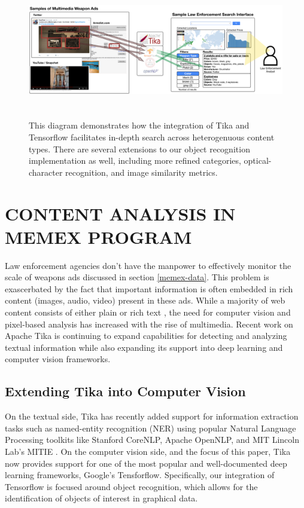 \begin{figure}
	\includegraphics[width=\textwidth,height=6cm]{interface-diagram}
	\caption{This diagram demonstrates how the integration of Tika and Tensorflow facilitates in-depth search across heterogenuous content types. There are several extensions to our object recognition implementation as well, including more refined categories, optical-character recognition, and image similarity metrics.}
	\label{fig:interface-diagram}
\end{figure}

\section{CONTENT ANALYSIS IN MEMEX PROGRAM} \label{sec:memex}
Law enforcement agencies don't have the manpower to effectively monitor the scale of weapons ads discussed in section \ref{memex-data}. This problem is exascerbated by the fact that important information is often embedded in rich content (images, audio, video) present in these ads. While a majority of web content consists of either plain or rich text \cite{mphillips-EOT2012}, the need for computer vision and pixel-based analysis has increased with the rise of multimedia. Recent work on Apache Tika is continuing to expand capabilities for detecting and analyzing textual information while also expanding its support into deep learning and computer vision frameworks. 

\subsection{Extending Tika into Computer Vision}

On the textual side, Tika has recently added support for information extraction tasks such as named-entity recognition (NER) using popular Natural Language Processing toolkits like Stanford CoreNLP\cite{Finkel:2005:INI:1219840.1219885}, Apache OpenNLP\cite{ApacheOpenNLP}, and MIT Lincoln Lab's MITIE \cite{MITIE-github}. On the computer vision side, and the focus of this paper, Tika now provides support for one of the most popular and well-documented deep learning frameworks, Google's Tensforflow. Specifically, our integration of Tensorflow is focused around object recognition, which allows for the identification of objects of interest in graphical data. 

